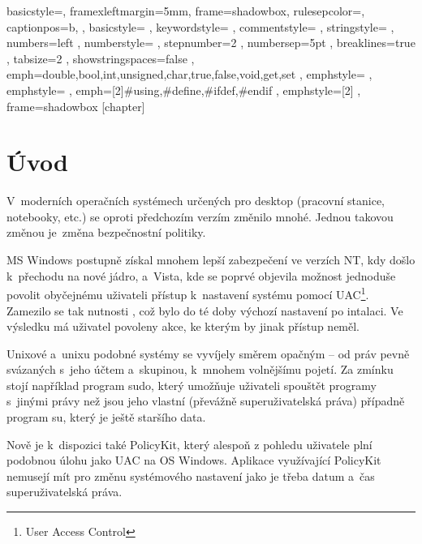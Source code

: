 \renewcommand*\lstlistingname{Výpis}
\setlength{\parskip}{3pt plus 1pt minus 1pt}
\lstset
{
    basicstyle=\footnotesize,
    framexleftmargin=5mm,
    frame=shadowbox,
    rulesepcolor=\color{blue},
    captionpos=b,
, basicstyle=\footnotesize\ttfamily
, keywordstyle=\color{blue}
, commentstyle=\color{OliveGreen}
, stringstyle=\color{Maroon}
, numbers=left
, numberstyle=\scriptsize
, stepnumber=2
, numbersep=5pt
, breaklines=true
, tabsize=2
, showstringspaces=false
, emph={double,bool,int,unsigned,char,true,false,void,get,set}
, emphstyle=\color{blue}
, emphstyle=\color{red}
, emph={[2]\#using,\#define,\#ifdef,\#endif}
, emphstyle={[2]\color{blue}}
, frame=shadowbox
}
[chapter]
\newcommand{\cppc}[1]{\lstinline[language=C++]$#1$}

\chapter{Úvod}
V~moderních operačních systémech určených pro desktop (pracovní stanice, notebooky, etc.) se oproti předchozím verzím změnilo mnohé. Jednou takovou změnou je~změna bezpečnostní politiky.

MS Windows postupně získal mnohem lepší zabezpečení ve verzích NT, kdy došlo k~přechodu na nové jádro, a~Vista, kde se poprvé objevila možnost jednoduše povolit obyčejnému uživateli přístup k~nastavení systému pomocí UAC\footnote{User Access Control}. Zamezilo se tak nutnosti , což bylo do té doby výchozí nastavení po intalaci. Ve výsledku má uživatel povoleny akce, ke kterým by jinak přístup neměl.

Unixové a~unixu podobné systémy se vyvíjely směrem opačným -- od práv pevně svázaných s~jeho účtem a~skupinou, k~mnohem volnějšímu pojetí. Za zmínku stojí například program sudo, který umožňuje uživateli spouštět programy s~jinými právy než jsou jeho vlastní (převážně superuživatelská práva) případně program su, který je ještě staršího data.

Nově je k~dispozici také PolicyKit, který alespoň z pohledu uživatele plní podobnou úlohu jako UAC na OS Windows. Aplikace využívající PolicyKit nemusejí mít pro změnu systémového nastavení jako je třeba datum a~čas superuživatelská práva.

